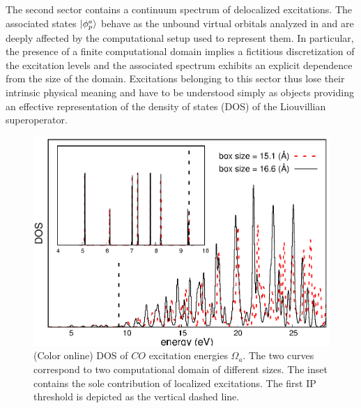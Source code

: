\documentclass[reprint,aps,prb]{revtex4-1}
\begin{document}
The second sector contains a continuum spectrum of delocalized excitations. The associated states $\ket{\phi_p^a}$ behave as the unbound virtual orbitals analyzed in \cite{boffi2016}
and are deeply affected by the computational setup used to represent them. In particular, the presence of a finite computational domain implies a fictitious discretization of the excitation levels and
the associated spectrum exhibits an explicit dependence from the size of the domain.
Excitations belonging to this sector thus lose their intrinsic physical meaning and have to be understood simply as objects providing an effective representation of the density of states (DOS) of the Liouvillian superoperator.

\begin{figure}[ht]
\includegraphics[scale=0.6]{Fig4_CO_dos_rev1.eps} %
\caption{(Color online) DOS of $CO$ excitation energies $\Omega_a$. The two curves correspond to two computational domain of different sizes. The inset contains the sole contribution of localized excitations. The first IP threshold is depicted as the vertical dashed line.}
\label{CO_exc}
\end{figure}
\end{document}
